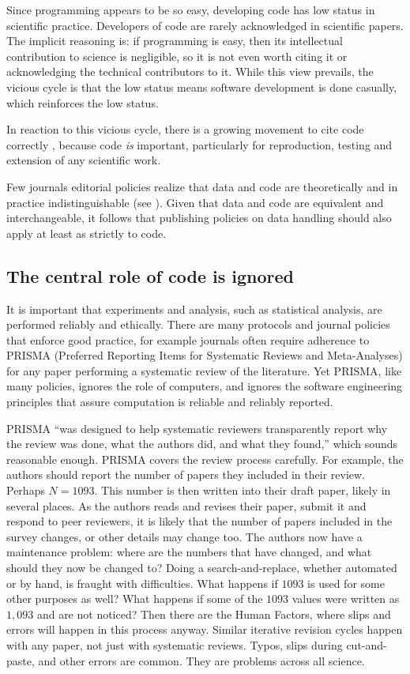 \documentclass{comjnl}
\begin{document}
\begin{change}
Since programming appears to be so easy, developing code has low status in scientific practice. Developers of code are rarely acknowledged in scientific papers. The implicit reasoning is: if programming is easy, then its intellectual contribution to science is negligible, so it is not even worth citing it or acknowledging the technical contributors to it. While this view prevails, the vicious cycle is that the low status means software development is done casually, which reinforces the low status.

In reaction to this vicious cycle, there is a growing movement to cite code correctly \cite{cite-code}, because code \emph{is\/} important, particularly for reproduction, testing and extension of any scientific work. 

Few journals editorial policies realize that data and code are theoretically and in practice indistinguishable (see \supplement). Given that data and code are equivalent and interchangeable, it follows that publishing policies on data handling should also apply at least as strictly to code.

\subsection{The central role of code is ignored}\label{central-role-of-code}
It is important that experiments and analysis, such as statistical analysis, are performed reliably and ethically. There are many protocols and journal policies that enforce good practice, for example journals often require adherence to PRISMA (Preferred Reporting Items for Systematic Reviews and Meta-Analyses) \cite{prisma} for any paper performing a systematic review of the literature. Yet PRISMA, like many policies, ignores the role of computers, and ignores the software engineering principles that assure computation is reliable and reliably reported. 

PRISMA ``was designed to help systematic reviewers transparently report why the review was done, what the authors did, and what they found,'' which sounds reasonable enough. PRISMA covers the review process carefully. For example, the authors should report the number of papers they included in their review. Perhaps $N=1093$. This number is then written into their draft paper, likely in several places. As the authors reads and revises their paper, submit it and respond to peer reviewers, it is likely that the number of papers included in the survey changes, or other details may change too. The authors now have a maintenance problem: where are the numbers that have changed, and what should they now be changed to? Doing a search-and-replace, whether automated or by hand, is fraught with difficulties. What happens if $1093$ is used for some other purposes as well? What happens if some of the $1093$ values were written as $1,093$ and are not noticed? Then there are the Human Factors, where slips and errors will happen in this process anyway. Similar iterative revision cycles happen with any paper, not just with systematic reviews. Typos, slips during cut-and-paste, and other errors are common. They are problems across all science.


\end{change}
\end{document}
